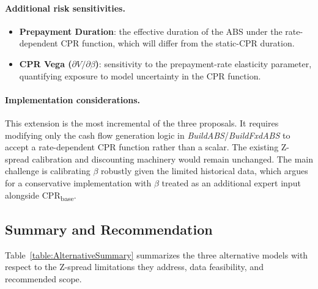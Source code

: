 \documentclass[reviewdoc]{pmv_report}  %
\begin{document}
\paragraph{Additional risk sensitivities.}
\begin{itemize}
  \item \textbf{Prepayment Duration}: the effective duration of the ABS under the rate-dependent CPR function, which will differ from the static-CPR duration.
  \item \textbf{CPR Vega ($\partial V / \partial \beta$)}: sensitivity to the prepayment-rate elasticity parameter, quantifying exposure to model uncertainty in the CPR function.
\end{itemize}

\paragraph{Implementation considerations.}
This extension is the most incremental of the three proposals.
It requires modifying only the cash flow generation logic in \textit{BuildABS}/\textit{BuildFxdABS} to accept a rate-dependent CPR function rather than a scalar.
The existing Z-spread calibration and discounting machinery would remain unchanged.
The main challenge is calibrating $\beta$ robustly given the limited historical data, which argues for a conservative implementation with $\beta$ treated as an additional expert input alongside CPR\textsubscript{base}.

\subsection{Summary and Recommendation}

Table~\ref{table:AlternativeSummary} summarizes the three alternative models with respect to the Z-spread limitations they address, data feasibility, and recommended scope.
\end{document}
